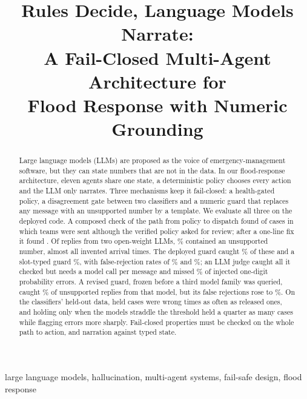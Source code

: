 \documentclass[conference]{IEEEtran}
\begin{document}
\title{Rules Decide, Language Models Narrate:\\
A Fail-Closed Multi-Agent Architecture for\\
Flood Response with Numeric Grounding}

\author{
}

\maketitle

\begin{abstract}
Large language models (LLMs) are proposed as the voice of emergency-management software, but they can state numbers that are not in the data. In our flood-response architecture, eleven agents share one state, a deterministic policy chooses every action and the LLM only narrates. Three mechanisms keep it fail-closed: a health-gated policy, a disagreement gate between two classifiers and a numeric guard that replaces any message with an unsupported number by a template. We evaluate all three on the deployed code. A composed check of the path from policy to dispatch found \EtoEViolBefore{} of \EtoECases{} cases in which teams were sent although the verified policy asked for review; after a one-line fix it found \EtoEViolAfter. Of \LiveN{} replies from two open-weight LLMs, \LiveUnsupPct\% contained an unsupported number, almost all invented arrival times. The deployed guard caught \LiveDepRec\% of these and a slot-typed guard \LiveTypRec\%, with false-rejection rates of \LiveDepFpr\% and \LiveTypFpr\%; an LLM judge caught all it checked but needs a model call per message and missed \JudgeProbSmallMiss\% of injected one-digit probability errors. A revised guard, frozen before a third model family was queried, caught \HoVtwoRec\% of unsupported replies from that model, but its false rejections rose to \HoVtwoFpr\%. On the classifiers' held-out data, held cases were wrong \GateDepErrRatio{} times as often as released ones, and holding only when the models straddle the threshold held a quarter as many cases while flagging errors more sharply. Fail-closed properties must be checked on the whole path to action, and narration against typed state.
\end{abstract}

\begin{IEEEkeywords}
large language models, hallucination, multi-agent systems, fail-safe design, flood response
\end{IEEEkeywords}
\end{document}
